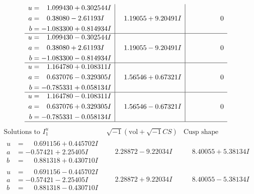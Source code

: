 \documentclass[1p]{elsarticle_modified}
\theoremstyle{definition}
\newcommand{\I}{\sqrt{-1}}
\begin{document}
$$\begin{array}{c|c|c}
\begin{aligned}
u &= \phantom{-}1.099430 + 0.302544 I \\
a &= \phantom{-}0.38080 - 2.61193 I \\
b &= -1.083300 + 0.814934 I\end{aligned}
 & \phantom{-}1.19055 + 9.20491 I & \phantom{-0.000000 } 0 \\ \hline\begin{aligned}
u &= \phantom{-}1.099430 - 0.302544 I \\
a &= \phantom{-}0.38080 + 2.61193 I \\
b &= -1.083300 - 0.814934 I\end{aligned}
 & \phantom{-}1.19055 - 9.20491 I & \phantom{-0.000000 } 0 \\ \hline\begin{aligned}
u &= \phantom{-}1.164780 + 0.108311 I \\
a &= \phantom{-}0.637076 - 0.329305 I \\
b &= -0.785331 + 0.058134 I\end{aligned}
 & \phantom{-}1.56546 + 0.67321 I & \phantom{-0.000000 } 0 \\ \hline\begin{aligned}
u &= \phantom{-}1.164780 - 0.108311 I \\
a &= \phantom{-}0.637076 + 0.329305 I \\
b &= -0.785331 - 0.058134 I\end{aligned}
 & \phantom{-}1.56546 - 0.67321 I & \phantom{-0.000000 } 0\\
 \hline 
 \end{array}$$\newpage$$\begin{array}{c|c|c}  
\text{Solutions to }I^u_{1}& \I (\text{vol} + \sqrt{-1}CS) & \text{Cusp shape}\\
 \hline 
\begin{aligned}
u &= \phantom{-}0.691156 + 0.445702 I \\
a &= -0.57421 + 2.25405 I \\
b &= \phantom{-}0.881318 + 0.430710 I\end{aligned}
 & \phantom{-}2.28872 - 9.22034 I & \phantom{-}8.40055 + 5.38134 I \\ \hline\begin{aligned}
u &= \phantom{-}0.691156 - 0.445702 I \\
a &= -0.57421 - 2.25405 I \\
b &= \phantom{-}0.881318 - 0.430710 I\end{aligned}
 & \phantom{-}2.28872 + 9.22034 I & \phantom{-}8.40055 - 5.38134 I \\ \hline\begin{aligned}

\end{aligned}
\end{array}$$
\end{document}
